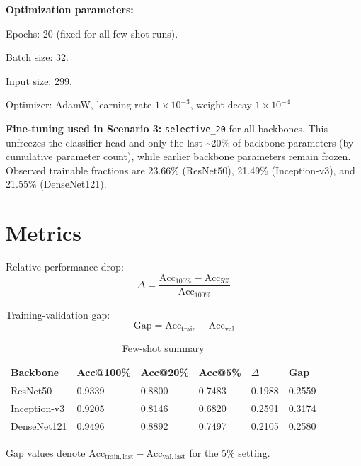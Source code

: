 \documentclass[11pt,a4paper]{report}
\renewenvironment{leftbar}[1][\hsize]
  {\def\FrameCommand{{\color{subsectionblue}\vrule width 3pt}\hspace{0pt}}%
   \MakeFramed{\hsize#1\advance\hsize-\width\FrameRestore}}
  {\endMakeFramed}
\renewenvironment{itemize}{\begin{leftbar}\begin{originalitemize}}{\end{originalitemize}\end{leftbar}}
\begin{document}
\textbf{Optimization parameters:}
\begin{itemize}
  \item Epochs: 20 (fixed for all few-shot runs).
  \item Batch size: 32.
  \item Input size: 299.
  \item Optimizer: AdamW, learning rate $1\times10^{-3}$, weight decay $1\times10^{-4}$.
\end{itemize}

\textbf{Fine-tuning used in Scenario 3:} \texttt{selective\_20} for all backbones.
This unfreezes the classifier head and only the last \textasciitilde20\% of backbone parameters (by cumulative parameter count), while earlier backbone parameters remain frozen. Observed trainable fractions are 23.66\% (ResNet50), 21.49\% (Inception-v3), and 21.55\% (DenseNet121).

\section{Metrics}
Relative performance drop:
\begin{equation}
\Delta = \frac{\mathrm{Acc}_{100\%} - \mathrm{Acc}_{5\%}}{\mathrm{Acc}_{100\%}}
\end{equation}

Training-validation gap:
\begin{equation}
\mathrm{Gap} = \mathrm{Acc}_{\mathrm{train}} - \mathrm{Acc}_{\mathrm{val}}
\end{equation}

\begin{table}[H]
\centering
\caption{Few-shot summary}
\label{tab:s3}
\begin{tabular}{llllll}
\toprule
\rowcolor{tableheader}
\textbf{Backbone} & \textbf{Acc@100\%} & \textbf{Acc@20\%} & \textbf{Acc@5\%} & \textbf{$\Delta$} & \textbf{Gap} \\
\midrule
ResNet50 & 0.9339 & 0.8800 & 0.7483 & 0.1988 & 0.2559 \\
Inception-v3 & 0.9205 & 0.8146 & 0.6820 & 0.2591 & 0.3174 \\
DenseNet121 & 0.9496 & 0.8892 & 0.7497 & 0.2105 & 0.2580 \\
\bottomrule
\end{tabular}
\end{table}

\vspace{-0.4em}
\begin{center}
\small
Gap values denote $\mathrm{Acc}_{\mathrm{train,last}}-\mathrm{Acc}_{\mathrm{val,last}}$ for the 5\% setting.
\end{center}
\end{document}
